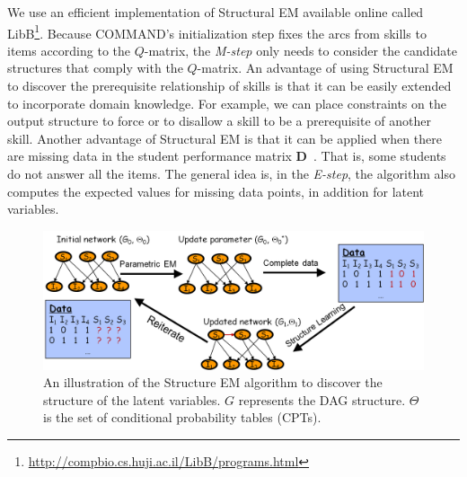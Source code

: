 \documentclass{edm_template}
\begin{document}
We use an efficient implementation of Structural EM available online called LibB\footnote{\url{http://compbio.cs.huji.ac.il/LibB/programs.html}}.
Because COMMAND's initialization step
fixes the arcs from skills to items according to the ${Q}$-matrix,
the \emph{M-step} only needs to consider the candidate structures that comply with the ${Q}$-matrix.
An advantage of using Structural EM to discover the prerequisite relationship of skills is that it can be easily extended to incorporate domain knowledge.
For example, we can  place constraints on the output structure to force or to disallow a skill to be a prerequisite of another skill.
Another advantage of Structural EM is that it can be applied when there are missing data in the student performance matrix $\mathbf{D}$~\cite{friedman1997learning}. 
That is, some students do not answer all the items.
The general idea is, in the \emph{E-step}, the algorithm also computes the expected values for missing data points, in addition for latent variables. 


\begin{figure}%
	\begin{center}
		\includegraphics[width=1.0\linewidth]{figures/sem.png}
	\end{center}
	\caption{\small An illustration of the Structure EM algorithm to discover the structure of the latent variables. $G$ represents the DAG structure. $\Theta$ is the set of conditional probability tables (CPTs).}
	\label{fig:sem} 
\end{figure} 
\end{document}
